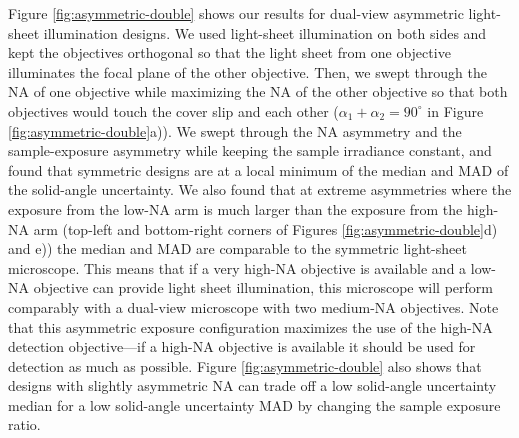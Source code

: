 \documentclass[10pt]{article}
\begin{document}
Figure \ref{fig:asymmetric-double} shows our results for dual-view asymmetric
light-sheet illumination designs. We used light-sheet illumination on both sides
and kept the objectives orthogonal so that the light sheet from one objective
illuminates the focal plane of the other objective. Then, we swept through the
NA of one objective while maximizing the NA of the other objective so that both
objectives would touch the cover slip and each other
($\alpha_1 + \alpha_2 = 90^{\circ}$ in Figure \ref{fig:asymmetric-double}a)). We
swept through the NA asymmetry and the sample-exposure asymmetry while keeping
the sample irradiance constant, and found that symmetric designs are at a local
minimum of the median and MAD of the solid-angle uncertainty. We also found that
at extreme asymmetries where the exposure from the low-NA arm is much larger
than the exposure from the high-NA arm (top-left and bottom-right corners of
Figures \ref{fig:asymmetric-double}d) and e)) the median and MAD are comparable
to the symmetric light-sheet microscope. This means that if a very high-NA
objective is available and a low-NA objective can provide light sheet
illumination, this microscope will perform comparably with a dual-view
microscope with two medium-NA objectives. Note that this asymmetric exposure
configuration maximizes the use of the high-NA detection objective---if a
high-NA objective is available it should be used for detection as much as
possible. Figure \ref{fig:asymmetric-double} also shows that designs with
slightly asymmetric NA can trade off a low solid-angle uncertainty median for a
low solid-angle uncertainty MAD by changing the sample exposure ratio.
\end{document}

